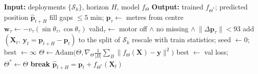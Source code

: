 \documentclass[sigconf]{acmart}
\begin{document}
\begin{algorithm}[t]
\caption{Drift prediction: build data, train, predict}
\label{alg:drift}
\begin{algorithmic}[1]
\Statex\textbf{Input:} deployments $\{\mathcal{S}_k\}$, horizon $H$, model $f_\Theta$
\Statex\textbf{Output:} trained $f_{\Theta^*}$; predicted position $\hat{\mathbf{p}}_{t+H}$
 
\State fill gaps $\leq5$ min; $\mathbf{p}_\tau\gets$ metres from centre
\State $\mathbf{w}_\tau\gets-v_\tau(\sin\theta_\tau,\cos\theta_\tau)$ 
\State valid$_\tau\gets$ motor off $\land$ no missing $\land\ \|\Delta\mathbf{p}_\tau\|<93$
\State add $(\mathbf{X}_t,\ \mathbf{y}_t=\mathbf{p}_{t+H}-\mathbf{p}_t)$ to the split of $\mathcal{S}_k$
\EndFor
\EndFor
\State rescale with train statistics; seed $\gets0$; best $\gets\infty$
 
\State $\Theta\gets\mathrm{Adam}\big(\Theta,\nabla_\Theta\tfrac{1}{|B|}\sum_{B}\|f_\Theta(\mathbf{X})-\mathbf{y}\|^2\big)$
\EndFor
{} best $\gets$ val loss; $\Theta^*\gets\Theta$
 \textbf{break}
\EndIf
\EndFor
\State \Return $\hat{\mathbf{p}}_{t+H}=\mathbf{p}_t+f_{\Theta^*}(\mathbf{X}_t)$ 
\end{algorithmic}
\end{algorithm}
\end{document}
